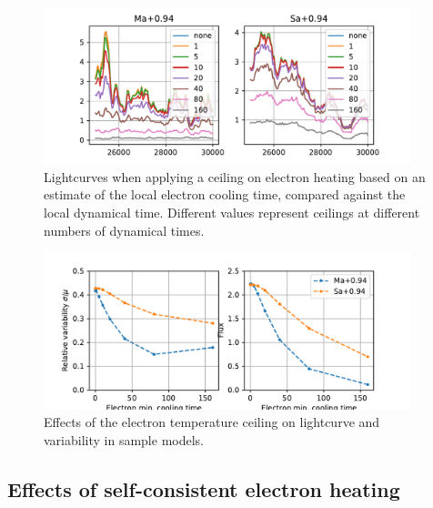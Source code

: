 \begin{figure}
    \centering
    \includegraphics[width=0.95\textwidth]{figures/ctcut_lightcurves.pdf}
    \caption{Lightcurves when applying a ceiling on electron heating based on an estimate of the local electron cooling time, compared against the local dynamical time. Different values represent ceilings at different numbers of dynamical times.}
    \label{fig:ceiling_lc1}
\end{figure}

\begin{figure}
    \centering
    \includegraphics[width=0.95\textwidth]{figures/ctcut_effects.pdf}
    \caption{Effects of the electron temperature ceiling on lightcurve and variability in sample models.}
    \label{fig:ceiling_lc2}
\end{figure}








\subsection{Effects of self-consistent electron heating}

